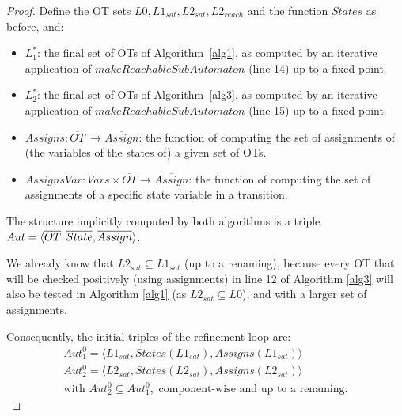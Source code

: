 \documentclass[smallcondensed]{svjour3}
\newcommand{\TODO}[1]{\textcolor{red}{\textbf{[TODO:#1]}}}
\begin{document}
\begin{proof}
  Define the OT sets $L0, L1_{sat}, L2_{sat}, L2_{reach}$ and the
  function $States$ as before, and: 

  \begin{itemize}
    \item $L_1^*$: the final set of OTs of Algorithm~\ref{alg1}, as computed
        by an iterative application of $makeReachableSubAutomaton$ (line
        14) up to a  fixed point.
    \item $L_2^*$: the final set of OTs of Algorithm~\ref{alg3}, as computed
        by an iterative application of $makeReachableSubAutomaton$ (line
        15) up to a fixed point.
    \item $Assigns : \overline{OT}\ \rightarrow \overline{Assign}$: the function
          of computing the set of assignments of (the variables of the
          states of) a given set of OTs.
    \item $AssignsVar : Vars\times\overline{OT} \rightarrow \overline{Assign}$: the function of computing the set of assignments of a specific state variable in a transition.
  \end{itemize}


\smallskip
The structure implicitly computed by both algorithms is a triple
$Aut= \langle \overline{OT},\overline{State},\\ \overline{Assign}\rangle$.

We already know that $L2_{sat}\subseteq L1_{sat}$ (up to a renaming),
because every OT that will be checked positively (using assignments) in line 12 of
Algorithm \ref{alg3} will also be tested in Algorithm \ref{alg1} (as
$L2_{sat}\subseteq L0$), and with a larger set of assignments.

Consequently, the initial triples of the refinement loop are:
\begin{align*}
Aut_1^0 = \langle L1_{sat}, States(L1_{sat}), Assigns(L1_{sat})\rangle \\
Aut_2^0 = \langle L2_{sat}, States(L2_{sat}), Assigns(L2_{sat})\rangle \\
\text{with } Aut_2^0 \subseteq Aut_1^0, \text{ component-wise and up to a renaming.}
\end{align*}



\end{proof}
\end{document}
